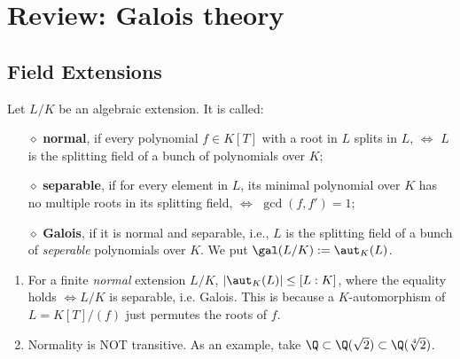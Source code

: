 \section{Review: Galois theory}
\subsection{Field Extensions}
Let $L/K$ be an algebraic extension. It is called: \begin{enumerate}
    \item [$\diamond$]\textbf{normal}, if every polynomial $f\in K[T]$ with a root in $L$ splits in $L$, $\iff$ $L$ is the splitting field of a bunch of polynomials over $K$;
    \item [$\diamond$]\textbf{separable}, if for every element in $L$, its minimal polynomial over $K$ has no multiple roots in its splitting field, $\iff$ $\gcd(f, f') = 1$;
    \item [$\diamond$]\textbf{Galois}, if it is normal and separable, i.e., $L$ is the splitting field of a bunch of \textit{seperable} polynomials over $K$. We put $\gal(L/K) := \aut_K(L)$.
\end{enumerate}
\begin{remark} {}
\begin{enumerate}
    \item For a finite \textit{normal} extension $L/K$, $|\aut_K(L)| \le [L:K]$, where the equality holds $\iff L/K$ is separable, i.e. Galois. This is because a $K$-automorphism of $L = K[T]/(f)$ just permutes the roots of $f$.
    \item Normality is NOT transitive. As an example, take $\Q\subset\Q(\sqrt{2})\subset\Q(\sqrt[4]{2})$.
\end{enumerate}
\end{remark}

